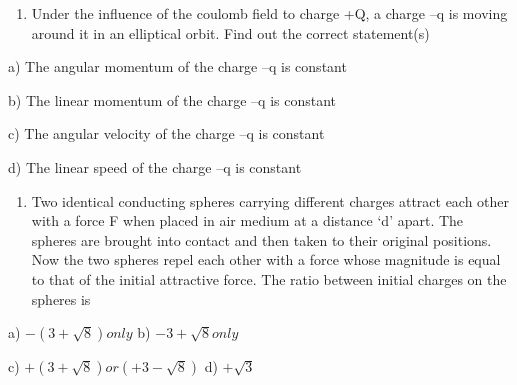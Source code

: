 \begin{enumerate}
\def\labelenumi{\arabic{enumi}.}
\setcounter{enumi}{24}
\item
  Under the influence of the coulomb field to charge +Q, a charge --q is
  moving around it in an elliptical orbit. Find out the correct
  statement(s)
\end{enumerate}

a) The angular momentum of the charge --q is constant

b) The linear momentum of the charge --q is constant

c) The angular velocity of the charge --q is constant

d) The linear speed of the charge --q is constant

\begin{enumerate}
\def\labelenumi{\arabic{enumi}.}
\setcounter{enumi}{25}
\item
  Two identical conducting spheres carrying different charges attract
  each other with a force F when placed in air medium at a distance `d'
  apart. The spheres are brought into contact and then taken to their
  original positions. Now the two spheres repel each other with a force
  whose magnitude is equal to that of the initial attractive force. The
  ratio between initial charges on the spheres is
\end{enumerate}

a) \(- \left( 3 + \sqrt{8} \right)only\) b) \(- 3 + \sqrt{8}only\)

c) \(+ \left( 3 + \sqrt{8} \right)or\left( + 3 - \sqrt{8} \right)\) d)
\(+ \sqrt{3}\)

